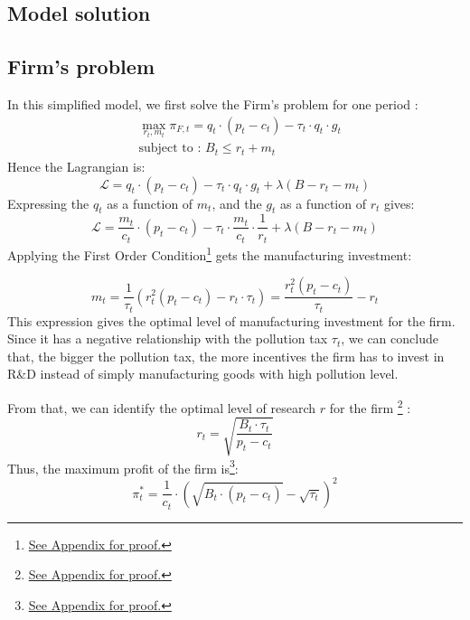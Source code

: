 \documentclass{article}
\begin{document}
\subsection{Model solution}

\subsection{Firm's problem}
In this simplified model, we first solve the Firm's problem for one period : 
\begin{equation*}
    \begin{split}
    & \max_{r_{t},m_{t}}{\pi_{F,t}=q_{t}\cdot\left(p_{t}-c_{t}\right)-\tau_{t}\cdot q_{t}\cdot g_{t}} \\ 
    & \text{subject to : } B_{t} \leq r_{t} + m_{t}
    \end{split}
\end{equation*}
Hence the Lagrangian is: 
\begin{equation*}
    \mathcal{L} = q_{t}\cdot\left(p_{t}-c_{t}\right)-\tau_{t}\cdot q_{t}\cdot g_{t}+\lambda\left(B-r_{t}-m_{t}\right)
\end{equation*}
Expressing the $q_{t}$ as a function of $m_{t}$, and the $g_{t}$ as a function of $r_{t}$ gives: 
\begin{equation*}
    \mathcal{L} = \frac{m_{t}}{c_{t}}\cdot\left(p_{t}-c_{t}\right)-\tau_{t}\cdot \frac{m_{t}}{c_{t}}\cdot \frac{1}{r_{t}}+\lambda\left(B-r_{t}-m_{t}\right)
\end{equation*}
Applying the First Order Condition\footnote{\hyperref[sec:proof3]{See Appendix for proof.}} gets the manufacturing investment:

\begin{equation}
    m_{t}=\frac{1}{\tau_{t}}\left(r_{t}^{2}(p_{t}-c_{t})-r_{t}\cdot \tau_{t}\right)=\frac{r_{t}^{2}\left(p_{t}-c_{t}\right)}{\tau_{t}}-r_{t}
\end{equation}
This expression gives the optimal level of manufacturing investment for the firm. Since it has a negative relationship with the pollution tax $\tau_{t}$, we can conclude that, the bigger the pollution tax, the more incentives the firm has to invest in R\&D instead of simply manufacturing goods with high pollution level. 

From that, we can identify the optimal level of research $r$ for the firm \footnote{\hyperref[sec:proof4]{See Appendix for proof.}} :
\begin{equation}
    r_{t}=\sqrt{\frac{B_{t}\cdot \tau_{t}}{p_{t}-c_{t}}}
\end{equation}
Thus, the maximum profit of the firm is\footnote{\hyperref[sec:proof5]{See Appendix for proof.}}: 
\begin{equation}
    \pi^{*}_{t}=\frac{1}{c_{t}}\cdot\left({\sqrt{B_{t}\cdot (p_{t}-c_{t})}-\sqrt{\tau_{t}}}\right)^{2}
\end{equation}
\end{document}
